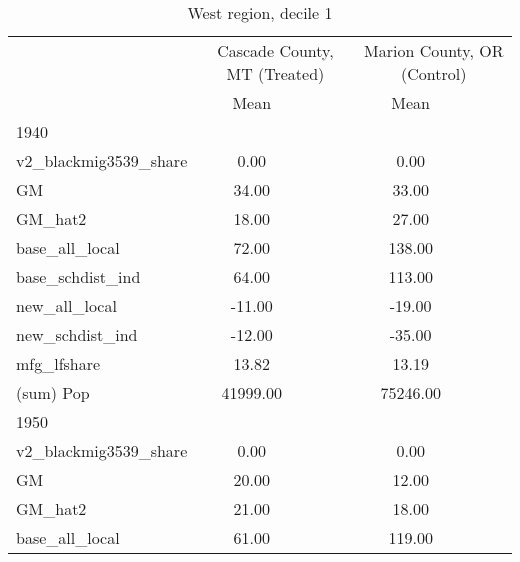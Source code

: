 \begin{table}[htbp]\centering
\def\sym#1{\ifmmode^{#1}\else\(^{#1}\)\fi}
\caption{West region, decile 1 \label{tab1}}
\begin{tabular}{l*{2}{ccc}}
\toprule
                    &\multicolumn{3}{c}{Cascade County, MT (Treated)}&\multicolumn{3}{c}{Marion County, OR (Control)}\\
                    &        Mean&            &            &        Mean&            &            \\
\midrule
1940                &            &            &            &            &            &            \\
v2\_blackmig3539\_share&        0.00&            &            &        0.00&            &            \\
GM                  &       34.00&            &            &       33.00&            &            \\
GM\_hat2             &       18.00&            &            &       27.00&            &            \\
base\_all\_local      &       72.00&            &            &      138.00&            &            \\
base\_schdist\_ind    &       64.00&            &            &      113.00&            &            \\
new\_all\_local       &      -11.00&            &            &      -19.00&            &            \\
new\_schdist\_ind     &      -12.00&            &            &      -35.00&            &            \\
mfg\_lfshare         &       13.82&            &            &       13.19&            &            \\
(sum) Pop           &    41999.00&            &            &    75246.00&            &            \\
\midrule
1950                &            &            &            &            &            &            \\
v2\_blackmig3539\_share&        0.00&            &            &        0.00&            &            \\
GM                  &       20.00&            &            &       12.00&            &            \\
GM\_hat2             &       21.00&            &            &       18.00&            &            \\
base\_all\_local      &       61.00&            &            &      119.00&            &            \\

\end{tabular}
\end{table}
